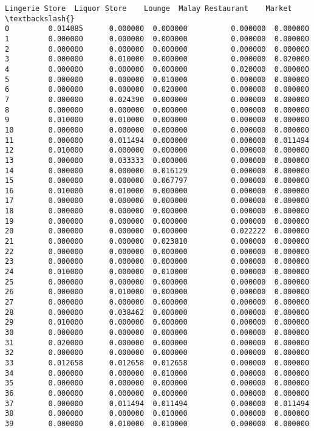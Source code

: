 \documentclass[11pt]{article}
\begin{document}
\begin{tcolorbox}[breakable, size=fbox, boxrule=.5pt, pad at break*=1mm, opacityfill=0]
\begin{Verbatim}[commandchars=\\\{\}]
    Lingerie Store  Liquor Store    Lounge  Malay Restaurant    Market  \textbackslash{}
0         0.014085      0.000000  0.000000          0.000000  0.000000
1         0.000000      0.000000  0.000000          0.000000  0.000000
2         0.000000      0.000000  0.000000          0.000000  0.000000
3         0.000000      0.010000  0.000000          0.000000  0.020000
4         0.000000      0.000000  0.000000          0.020000  0.000000
5         0.000000      0.000000  0.010000          0.000000  0.000000
6         0.000000      0.000000  0.020000          0.000000  0.000000
7         0.000000      0.024390  0.000000          0.000000  0.000000
8         0.000000      0.000000  0.000000          0.000000  0.000000
9         0.010000      0.010000  0.000000          0.000000  0.000000
10        0.000000      0.000000  0.000000          0.000000  0.000000
11        0.000000      0.011494  0.000000          0.000000  0.011494
12        0.010000      0.000000  0.000000          0.000000  0.000000
13        0.000000      0.033333  0.000000          0.000000  0.000000
14        0.000000      0.000000  0.016129          0.000000  0.000000
15        0.000000      0.000000  0.067797          0.000000  0.000000
16        0.010000      0.010000  0.000000          0.000000  0.000000
17        0.000000      0.000000  0.000000          0.000000  0.000000
18        0.000000      0.000000  0.000000          0.000000  0.000000
19        0.000000      0.000000  0.000000          0.000000  0.000000
20        0.000000      0.000000  0.000000          0.022222  0.000000
21        0.000000      0.000000  0.023810          0.000000  0.000000
22        0.000000      0.000000  0.000000          0.000000  0.000000
23        0.000000      0.000000  0.000000          0.000000  0.000000
24        0.010000      0.000000  0.010000          0.000000  0.000000
25        0.000000      0.000000  0.000000          0.000000  0.000000
26        0.000000      0.010000  0.000000          0.000000  0.000000
27        0.000000      0.000000  0.000000          0.000000  0.000000
28        0.000000      0.038462  0.000000          0.000000  0.000000
29        0.010000      0.000000  0.000000          0.000000  0.000000
30        0.000000      0.000000  0.000000          0.000000  0.000000
31        0.020000      0.000000  0.000000          0.000000  0.000000
32        0.000000      0.000000  0.000000          0.000000  0.000000
33        0.012658      0.012658  0.012658          0.000000  0.000000
34        0.000000      0.000000  0.010000          0.000000  0.000000
35        0.000000      0.000000  0.000000          0.000000  0.000000
36        0.000000      0.000000  0.000000          0.000000  0.000000
37        0.000000      0.011494  0.011494          0.000000  0.011494
38        0.000000      0.000000  0.010000          0.000000  0.000000
39        0.000000      0.010000  0.010000          0.000000  0.000000


\end{Verbatim}
\end{tcolorbox}
\end{document}
